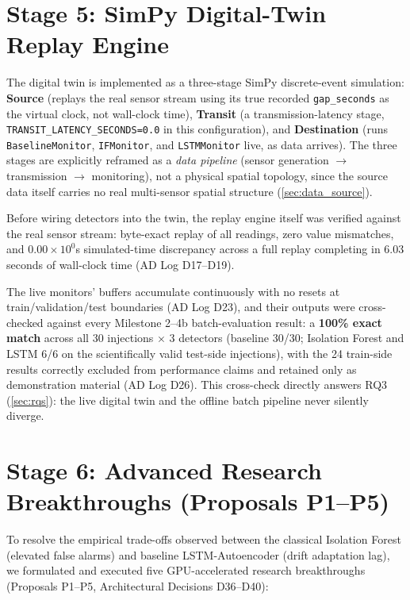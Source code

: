 \documentclass[11pt,a4paper,oneside]{report}
\begin{document}
\section{Stage 5: SimPy Digital-Twin Replay Engine}
\label{sec:digital_twin}

The digital twin is implemented as a three-stage SimPy discrete-event simulation: \textbf{Source} (replays the real sensor stream using its true recorded \texttt{gap\_seconds} as the virtual clock, not wall-clock time), \textbf{Transit} (a transmission-latency stage, \texttt{TRANSIT\_LATENCY\_SECONDS=0.0} in this configuration), and \textbf{Destination} (runs \texttt{BaselineMonitor}, \texttt{IFMonitor}, and \texttt{LSTMMonitor} live, as data arrives). The three stages are explicitly reframed as a \emph{data pipeline} (sensor generation $\rightarrow$ transmission $\rightarrow$ monitoring), not a physical spatial topology, since the source data itself carries no real multi-sensor spatial structure (\cref{sec:data_source}).

\begin{methodologydecision}
Before wiring detectors into the twin, the replay engine itself was verified against the real sensor stream: byte-exact replay of all readings, zero value mismatches, and $0.00\times10^{0}$s simulated-time discrepancy across a full replay completing in 6.03 seconds of wall-clock time (AD Log D17--D19).
\end{methodologydecision}

The live monitors' buffers accumulate continuously with no resets at train/validation/test boundaries (AD Log D23), and their outputs were cross-checked against every Milestone 2--4b batch-evaluation result: a \textbf{100\% exact match} across all 30 injections $\times$ 3 detectors (baseline 30/30; Isolation Forest and LSTM 6/6 on the scientifically valid test-side injections), with the 24 train-side results correctly excluded from performance claims and retained only as demonstration material (AD Log D26). This cross-check directly answers RQ3 (\cref{sec:rqs}): the live digital twin and the offline batch pipeline never silently diverge.

\section{Stage 6: Advanced Research Breakthroughs (Proposals P1--P5)}
\label{sec:advanced_research}

To resolve the empirical trade-offs observed between the classical Isolation Forest (elevated false alarms) and baseline LSTM-Autoencoder (drift adaptation lag), we formulated and executed five GPU-accelerated research breakthroughs (Proposals P1--P5, Architectural Decisions D36--D40):
\end{document}
